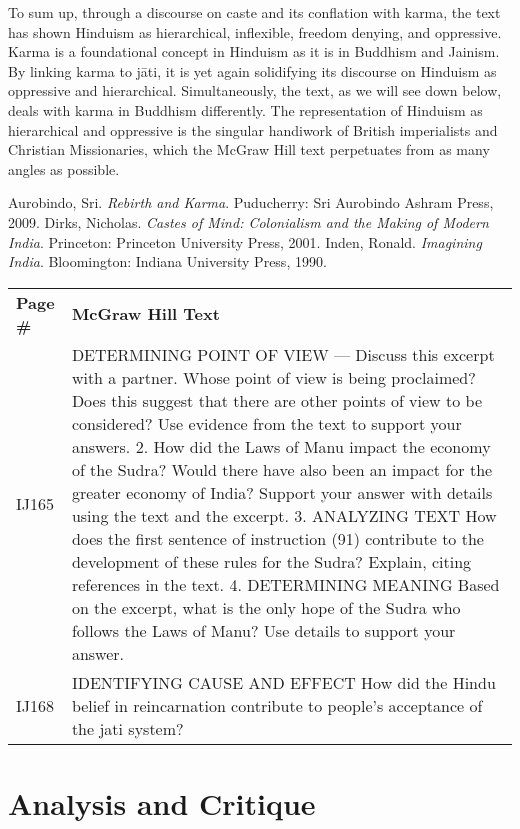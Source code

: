 To sum up, through a discourse on caste and its conflation with karma, the text has shown Hinduism as hierarchical, inflexible, freedom denying, and oppressive. Karma is a foundational concept in Hinduism as it is in Buddhism and Jainism. By linking karma to jāti, it is yet again solidifying its discourse on Hinduism as oppressive and hierarchical. Simultaneously, the text, as we will see down below, deals with karma in Buddhism differently. The representation of Hinduism as hierarchical and oppressive is the singular handiwork of British imperialists and Christian Missionaries, which the McGraw Hill text perpetuates from as many angles as possible.

\begin{thebibliography}{99}
 Aurobindo, Sri. \textit{Rebirth and Karma}. Puducherry: Sri Aurobindo Ashram Press, 2009.
 Dirks, Nicholas. \textit{Castes of Mind: Colonialism and the Making of Modern India}. Princeton: Princeton University Press, 2001.
 Inden, Ronald. \textit{Imagining India}. Bloomington: Indiana University Press, 1990.
\end{thebibliography}
\newpage

\begin{longtable}{|>{\raggedleft}p{1.5cm}|p{8.5cm}|}
\multicolumn{2}{c}{\textbf{Table: 8}}\\ 
\hline
\textbf{Page \#} & \textbf{McGraw Hill Text} \tabularnewline
\hline
IJ165 & DETERMINING POINT OF VIEW — Discuss this excerpt with a partner. Whose point of view is being proclaimed? Does this suggest that there are other points of view to be considered? Use evidence from the text to support your answers. 2. How did the Laws of Manu impact the economy of the Sudra? Would there have also been an impact for the greater economy of India? Support your answer with details using the text and the excerpt. 3. ANALYZING TEXT How does the first sentence of instruction (91) contribute to the development of these rules for the Sudra? Explain, citing references in the text. 4. DETERMINING MEANING Based on the excerpt, what is the only hope of the Sudra who follows the Laws of Manu? Use details to support your answer. \tabularnewline
\hline
IJ168 & IDENTIFYING CAUSE AND EFFECT How did the Hindu belief in reincarnation contribute to people’s acceptance of the jati system? \tabularnewline
\hline
\end{longtable}

\section*{Analysis and Critique} 

